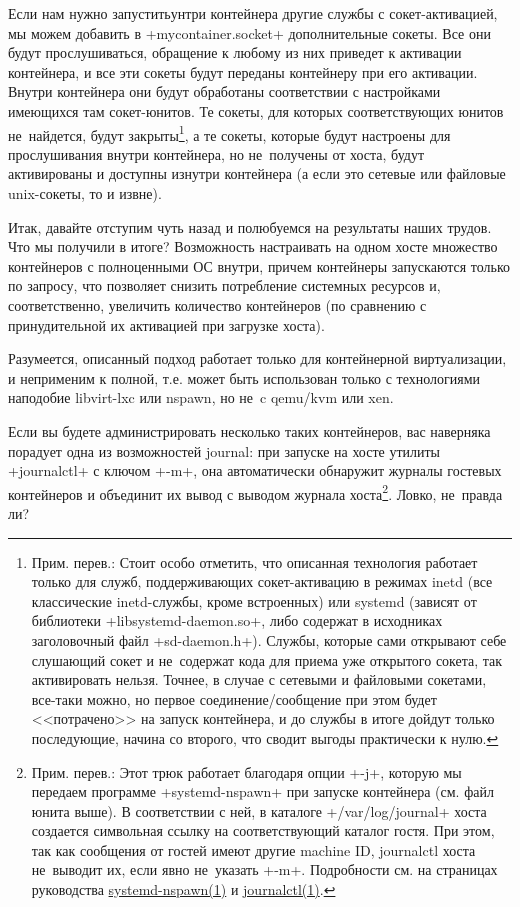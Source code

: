 \documentclass[10pt,oneside,a4paper]{article}
\begin{document}
Если нам нужно запуститьунтри контейнера другие службы с сокет-активацией, мы
можем добавить в +mycontainer.socket+ дополнительные сокеты. Все они будут
прослушиваться, обращение к любому из них приведет к активации контейнера, и все
эти сокеты будут переданы контейнеру при его активации. Внутри контейнера они
будут обработаны соответствии с настройками имеющихся там сокет-юнитов. Те
сокеты, для которых соответствующих юнитов не~найдется, будут
закрыты\footnote{Прим. перев.: Стоит особо отметить, что описанная технология
работает только для служб, поддерживающих сокет-активацию в режимах inetd (все
классические inetd-службы, кроме встроенных) или systemd (зависят от библиотеки
+libsystemd-daemon.so+, либо содержат в исходниках заголовочный файл
+sd-daemon.h+). Службы, которые сами открывают себе слушающий сокет и
не~содержат кода для приема уже открытого сокета, так активировать нельзя.
Точнее, в случае с сетевыми и файловыми сокетами, все-таки можно, но первое
соединение/сообщение при этом будет <<потрачено>> на запуск контейнера, и до
службы в итоге дойдут только последующие, начина со второго, что сводит выгоды
практически к нулю.}, а те сокеты, которые будут настроены для прослушивания
внутри контейнера, но не~получены от хоста, будут активированы и доступны
изнутри контейнера (а если это сетевые или файловые unix-сокеты, то и извне).

Итак, давайте отступим чуть назад и полюбуемся на результаты наших трудов. Что
мы получили в итоге? Возможность настраивать на одном хосте множество
контейнеров с полноценными ОС внутри, причем контейнеры запускаются только по
запросу, что позволяет снизить потребление системных ресурсов и, соответственно,
увеличить количество контейнеров (по сравнению с принудительной их активацией
при загрузке хоста).

Разумеется, описанный подход работает только для контейнерной виртуализации, и
неприменим к полной, т.е. может быть использован только с технологиями наподобие
libvirt-lxc или nspawn, но не~c qemu/kvm или xen.

Если вы будете администрировать несколько таких контейнеров, вас наверняка
порадует одна из возможностей journal: при запуске на хосте утилиты +journalctl+
с ключом +-m+, она автоматически обнаружит журналы гостевых контейнеров и
объединит их вывод с выводом журнала хоста\footnote{Прим. перев.: Этот трюк
работает благодаря опции +-j+, которую мы передаем программе +systemd-nspawn+
при запуске контейнера (см. файл юнита выше). В соответствии с ней, в каталоге
+/var/log/journal+ хоста создается символьная ссылку на соответствующий каталог
гостя. При этом, так как сообщения от гостей имеют другие machine ID, journalctl
хоста не~выводит их, если явно не~указать +-m+. Подробности см. на страницах
руководства
\href{http://www.freedesktop.org/software/systemd/man/systemd-nspawn.html}{systemd-nspawn(1)}
и
\href{http://www.freedesktop.org/software/systemd/man/journalctl.html}{journalctl(1)}.}.
Ловко, не~правда ли?
\end{document}
